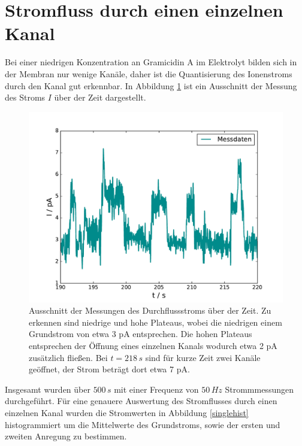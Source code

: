 \documentclass{include/thesisclass3}
\newcommand{\e}[1]{\,\si{#1}}
\begin{document}
\section{Stromfluss durch einen einzelnen Kanal}
Bei einer niedrigen Konzentration an Gramicidin A im Elektrolyt bilden sich in der Membran nur wenige Kanäle, daher ist die Quantisierung des Ionenstroms durch den Kanal gut erkennbar. In Abbildung \ref{singlechannel} ist ein Ausschnitt der Messung des Stroms $I$ über der Zeit dargestellt.
\begin{figure}[H]
\centering
\includegraphics[scale=0.7]{images/ssingle_channel.pdf}
\caption{Ausschnitt der Messungen des Durchflussstroms über der Zeit. Zu erkennen sind niedrige und hohe Plateaus, wobei die niedrigen einem Grundstrom von etwa 3 pA entsprechen. Die hohen Plateaus entsprechen der Öffnung eines einzelnen Kanals wodurch etwa 2 pA zusätzlich fließen. Bei $t = 218\e{s}$ sind für kurze Zeit zwei Kanäle geöffnet, der Strom beträgt dort etwa 7 pA.}
\label{singlechannel}
\end{figure}
Insgesamt wurden über $500\e{s}$ mit einer Frequenz von $50\e{Hz}$ Strommmessungen durchgeführt. Für eine genauere Auswertung des Stromflusses durch einen einzelnen Kanal wurden die Stromwerten in Abbildung \ref{singlehist} histogrammiert um die Mittelwerte des Grundstroms, sowie der ersten und zweiten Anregung zu bestimmen.
\end{document}
